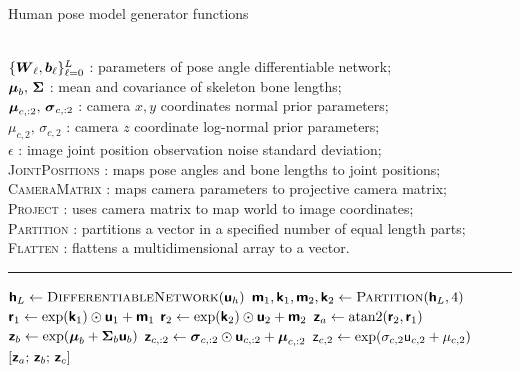 \begin{algorithm}[t]
\caption{Human pose model generator functions}
\label{alg:pose-model-generators}
\begin{algorithmic}
\small
    \Require\\
    $\lbrace \boldsymbol{W}_\ell, \boldsymbol{b}_\ell \rbrace_{\ell=0}^L$ : parameters of pose angle differentiable network;\\
    $\boldsymbol{\mu}_b,\,\boldsymbol{\Sigma}$ : mean and covariance of skeleton bone lengths;\\
    $\boldsymbol{\mu}_{c,:2},\,\boldsymbol{\sigma}_{c,:2}$ : camera $x,y$ coordinates normal prior parameters;\\
    $\mu_{c,2},\,\sigma_{c,2}$ : camera $z$ coordinate log-normal prior parameters;\\
    $\epsilon$ : image joint position observation noise standard deviation; \\
    \textsc{JointPositions} : maps pose angles and bone lengths to joint positions;\\
    \textsc{CameraMatrix} : maps camera parameters to projective camera matrix;\\
    \textsc{Project} : uses camera matrix to map world  to image coordinates; \\ 
    \textsc{Partition} : partitions a vector in a specified number of equal length parts; \\
    \textsc{Flatten} : flattens a multidimensional array to a vector. \\
\end{algorithmic}
\vspace{-1mm}
\hrule
\vspace{1mm}
\small
\begin{algorithmic}
  \State $\rvct{h}_L \gets \Call{DifferentiableNetwork}{\rvct{u}_h}$
  \State $\rvct{m}_1,\rvct{k}_1,\rvct{m}_2,\rvct{k}_2 \gets \Call{Partition}{\rvct{h}_L, 4}$
  \State $\boldsymbol{\mathsf{r}}_1 \gets \exp(\boldsymbol{\mathsf{k}}_1) \odot \boldsymbol{\mathsf{u}}_1 + \boldsymbol{\mathsf{m}}_1$
  \State $\boldsymbol{\mathsf{r}}_2 \gets \exp(\boldsymbol{\mathsf{k}}_2) \odot \boldsymbol{\mathsf{u}}_2 + \boldsymbol{\mathsf{m}}_2$
  \State $\boldsymbol{\mathsf{z}}_a \gets \textrm{atan2}(\boldsymbol{\mathsf{r}}_2, \boldsymbol{\mathsf{r}}_1)$
  \State $\rvct{z}_b \gets \exp\lpa \vct{\mu}_b + \mtx{\Sigma}_b \rvct{u}_b\rpa$
  \State $\boldsymbol{\mathsf{z}}_{c,:2} \gets \boldsymbol{\sigma}_{c,:2} \odot \boldsymbol{\mathsf{u}}_{c,:2} + \boldsymbol{\mu}_{c,:2}$
  \State $\rvar{z}_{c,2} \gets \exp\lpa \sigma_{c,2}  \rvar{u}_{c,2} + \mu_{c,2} \rpa$
  \State \Return $[\boldsymbol{\mathsf{z}}_a;\,\boldsymbol{\mathsf{z}}_b;\,\boldsymbol{\mathsf{z}}_c]$
\EndFunction
{}

\end{algorithmic}
\end{algorithm}
